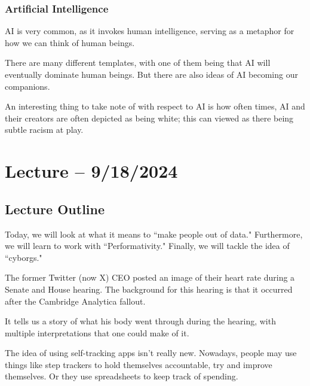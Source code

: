\documentclass[openany]{book}
\begin{document}

\subsubsection{Artificial Intelligence}
AI is very common, as it invokes human intelligence, serving as a metaphor for how we can think of human beings.

There are many different templates, with one of them being that AI will eventually dominate human beings. But there are also ideas of AI becoming our companions.

An interesting thing to take note of with respect to AI is how often times, AI and their creators are often depicted as being white; this can viewed as there being subtle racism at play.

\section{Lecture -- 9/18/2024}
\subsection{Lecture Outline}
Today, we will look at what it means to ``make people out of data." Furthermore, we will learn to work with ``Performativity." Finally, we will tackle the idea of ``cyborgs."

\begin{example}
	The former Twitter (now X) CEO posted an image of their heart rate during a Senate and House hearing. The background for this hearing is that it occurred after the Cambridge Analytica fallout.
	
	It tells us a story of what his body went through during the hearing, with multiple interpretations that one could make of it.
\end{example}

The idea of using self-tracking apps isn't really new. Nowadays, people may use things like step trackers to hold themselves accountable, try and improve themselves. Or they use spreadsheets to keep track of spending.
\end{document}

